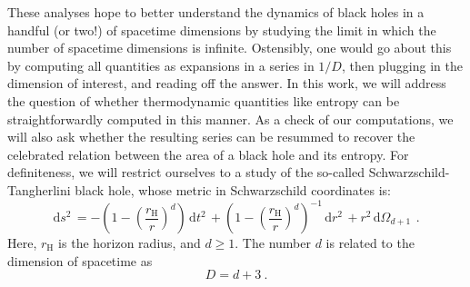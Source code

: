 \documentclass[a4paper,11pt]{article}
\newcommand{\dd}[1]{\text{d}#1 \, }
\begin{document}
These analyses hope to better understand the dynamics of black holes in a handful (or two!) of spacetime dimensions by studying the limit in which the number of spacetime dimensions is infinite. Ostensibly, one would go about this by computing all quantities as expansions in a series in $1/D$, then plugging in the dimension of interest, and reading off the answer. In this work, we will address the question of whether thermodynamic quantities like entropy can be straightforwardly computed in this manner. As a check of our computations, we will also ask whether the resulting series can be resummed to recover the celebrated relation between the area of a black hole and its entropy. For definiteness, we will restrict ourselves to a study of the so-called Schwarzschild-Tangherlini black hole, whose metric in Schwarzschild coordinates is:
\begin{equation}
\label{eq:TangBH}
\dd{s^2} = -\left( 1- \left(\frac{r_\text{H}}{r}\right)^{d}\right) \,\dd{t^2} + \left( 1- \left(\frac{r_\text{H}}{r}\right)^{d}\right)^{-1} \, \dd{r^2} + r^2 \, \dd{\Omega_{d+1}} \ .
\end{equation}
Here, $r_{\text{H}}$ is the horizon radius, and $d \geq 1$. The number $d$ is related to the dimension of spacetime as
\begin{equation}
D = d+3 \ .
\end{equation}
\end{document}
